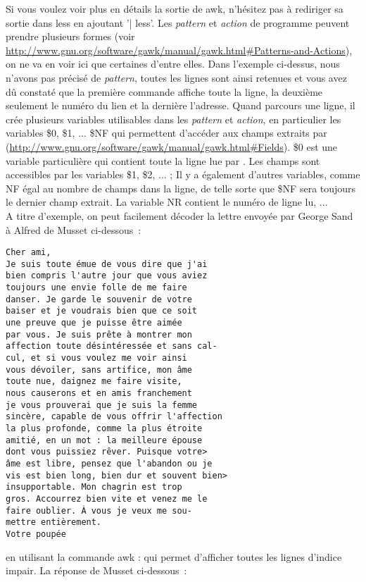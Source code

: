 Si vous voulez voir plus en détails la sortie de awk, n'hésitez pas à rediriger sa sortie dans less en ajoutant '| less'. Les \emph{pattern} et \emph{action} de programme \awk peuvent prendre plusieurs formes (voir \url{http://www.gnu.org/software/gawk/manual/gawk.html#Patterns-and-Actions}), on ne va en voir ici que certaines d'entre elles.  Dans l'exemple ci-dessus, nous n'avons pas précisé de \emph{pattern}, toutes les lignes sont ainsi retenues et vous avez dû constaté que la première commande affiche toute la ligne, la deuxième seulement le numéro du lien et la dernière l'adresse. Quand \awk parcours une ligne, il crée plusieurs variables utilisables dans les \emph{pattern} et \emph{action}, en particulier les variables \$0, \$1, ... \$NF qui permettent d'accéder aux champs extraits par \awk (\url{http://www.gnu.org/software/gawk/manual/gawk.html#Fields}). \$0 est une variable particulière qui contient toute la ligne lue par \awk. Les champs sont accessibles par les variables \$1, \$2, ... ; Il y a également d'autres variables, comme NF égal au nombre de champs dans la ligne, de telle sorte que \$NF sera toujours le dernier champ extrait. La variable NR contient le numéro de ligne lu, ... \\

A titre d'exemple, on peut facilement décoder la lettre envoyée par George Sand à Alfred de Musset ci-dessous~:
\begin{center}
\begin{verbatim}
Cher ami,
Je suis toute émue de vous dire que j'ai
bien compris l'autre jour que vous aviez
toujours une envie folle de me faire
danser. Je garde le souvenir de votre
baiser et je voudrais bien que ce soit
une preuve que je puisse être aimée
par vous. Je suis prête à montrer mon
affection toute désintéressée et sans cal-
cul, et si vous voulez me voir ainsi
vous dévoiler, sans artifice, mon âme
toute nue, daignez me faire visite,
nous causerons et en amis franchement
je vous prouverai que je suis la femme
sincère, capable de vous offrir l'affection
la plus profonde, comme la plus étroite
amitié, en un mot : la meilleure épouse
dont vous puissiez rêver. Puisque votre>
âme est libre, pensez que l'abandon ou je
vis est bien long, bien dur et souvent bien>
insupportable. Mon chagrin est trop
gros. Accourrez bien vite et venez me le
faire oublier. À vous je veux me sou-
mettre entièrement.
Votre poupée 
\end{verbatim}
\end{center}

en utilisant la commande awk :  qui permet d'afficher toutes les lignes d'indice impair. La réponse de Musset ci-dessous~:

